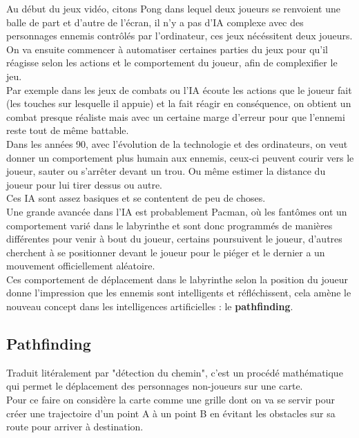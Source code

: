 \documentclass[a4paper,10pt,final,fleqn]{article}
\begin{document}
	Au début du jeux vidéo, citons Pong dans lequel deux joueurs se renvoient une balle de part et d'autre de l'écran, il n'y a pas d'IA complexe avec des personnages ennemis contrôlés par l'ordinateur, ces jeux nécéssitent deux joueurs.\\

	On va ensuite commencer à automatiser certaines parties du jeux pour qu'il réagisse selon les actions et le comportement du joueur, afin de complexifier le jeu.\\
	Par exemple dans les jeux de combats ou l'IA écoute les actions que le joueur fait (les touches sur lesquelle il appuie) et la fait réagir en conséquence, on obtient un combat presque réaliste mais avec un certaine marge d'erreur pour que l'ennemi reste tout de même battable.\\

	Dans les années 90, avec l'évolution de la technologie et des ordinateurs, on veut donner un comportement plus humain aux ennemis, ceux-ci peuvent courir vers le joueur, sauter ou s'arrêter devant un trou. Ou même estimer la distance du joueur pour lui tirer dessus ou autre.\\ Ces IA sont assez basiques et se contentent de peu de choses.\\

	Une grande avancée dans l'IA est probablement Pacman, où les fantômes ont un comportement varié dans le labyrinthe et sont donc programmés de manières différentes pour venir à bout du joueur, certains poursuivent le joueur, d'autres cherchent à se positionner devant le joueur pour le piéger et le dernier a un mouvement officiellement aléatoire.\\

	Ces comportement de déplacement dans le labyrinthe selon la position du joueur donne l'impression que les ennemis sont intelligents et réfléchissent, cela amène le nouveau concept dans les intelligences artificielles : le \textbf{pathfinding}.

	\subsection{Pathfinding}

		Traduit litéralement par "détection du chemin", c'est un procédé mathématique qui permet le déplacement des personnages non-joueurs sur une carte.\\

		Pour ce faire on considère la carte comme une grille dont on va se servir pour créer une trajectoire d'un point A à un point B en évitant les obstacles sur sa route pour arriver à destination.
\end{document}
